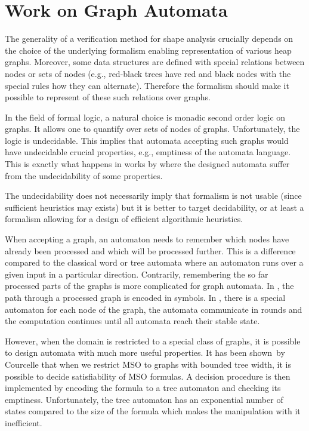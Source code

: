 	\section{Work on Graph Automata}

	The generality of a verification method for shape analysis crucially depends on the choice
	of the underlying formalism enabling representation of various heap graphs.
	Moreover, some data structures are defined with special relations
	between nodes or sets of nodes (e.g., red-black trees have red and black nodes with
	the special rules how they can alternate).
	Therefore the formalism should make it possible to represent of these such relations over graphs.

	In the field of formal logic, a natural choice is monadic second order logic on graphs.
	It allows one to quantify over sets of nodes of graphs.
	Unfortunately, the logic is undecidable.
	This implies that automata accepting such graphs would have undecidable
	crucial properties, e.g., emptiness of the automata language.
	This is exactly what happens in works by \cite{Thomas:automata, soa-reiter15} where the designed automata
	suffer from the undecidability of some properties.

	The undecidability does not necessarily imply that formalism is not usable (since sufficient
	heuristics may exists) but it is better to target decidability, or at least a formalism
	allowing for a design of efficient algorithmic heuristics.

	When accepting a graph, an automaton needs to remember which nodes have already been
	processed and which will be processed further.
	This is a difference compared to the classical word or tree automata where an automaton runs over
	a given input in a particular direction.
	Contrarily, remembering the so far processed parts of the graphs is more complicated for graph automata.
	In \cite{Thomas:automata}, the path through a processed graph is encoded in symbols.
	In \cite{soa-reiter15}, there is a special automaton for each node of the graph, the automata
	communicate in rounds and the computation continues until all automata reach their stable state.

	However, when the domain is restricted to a special class of graphs, it is possible to design
	automata with much more useful properties.
	It has been shown~by Courcelle \cite{courcell_graph_2012} that when we restrict MSO to graphs 
	with bounded tree width, it is possible to decide satisfiability of MSO formulas.
	A decision procedure is then implemented by encoding the formula to a tree automaton
	and checking its emptiness.
	Unfortunately, the tree automaton has an exponential number of states
	compared to the size of the formula which makes the manipulation with it inefficient.

